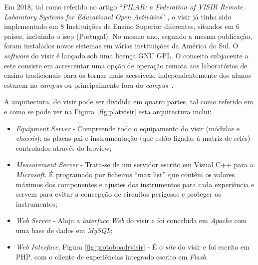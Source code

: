 Em 2018, tal como referido no artigo ``\textit{PILAR: a Federation of VISIR Remote Laboratory Systems for Educational Open Activities}'' \cite{PILARFederationVISIR}, o \acrshort{visir} já tinha sido implementado em 8 Instituições de Ensino Superior diferentes, situados em 6 países, incluindo o \acrshort{isep} (Portugal). No mesmo ano, segundo a mesma publicação, foram instalados novos sistemas em várias instituições da América do Sul. O \textit{software} do \acrshort{visir} é lançado sob uma licença GNU GPL. O conceito subjacente a este consiste em acrescentar uma opção de operação remota aos laboratórios de ensino tradicionais para os tornar mais acessíveis, independentemente dos alunos estarem no \textit{campus} ou principalmente fora do \textit{campus}~\cite{TheVISIRproject}.

A arquitectura, do \acrshort{visir} pode ser dividida em quatro partes, tal como referido em \cite{tawfikexperiences} e como se pode ver na Figura~\ref{fig:platvisir} esta arquitectura inclui:
\begin{itemize}
    \item \textit{Equipment  Server} - Compreende todo o equipamento do \acrshort{visir} (módulos e \textit{chassis}): as placas \acrfull{pxi} e instrumentação (que estão ligadas à matriz de relés) controlados através do \acrshort{labview};
    \item \textit{Measurement Server} - Trata-se de um servidor escrito em Visual C++ para a \textit{Microsoft}. É programado por ficheiros ``max list'' que contêm os valores máximos dos componentes e ajustes dos instrumentos para cada experiência e servem para evitar a concepção de circuitos perigosos e proteger os instrumentos;
    \item \textit{Web Server} - Aloja a \textit{interface Web} do \acrshort{visir} e foi concebida em \textit{Apache} com uma base de dados em \textit{MySQL};
    \item \textit{Web Interface}, Figura \ref{fig:protoboadrvisir} - É o \textit{site} do \acrshort{visir} e foi escrito em PHP, com o cliente de experiências integrado escrito em \textit{Flash}.
\end{itemize}

